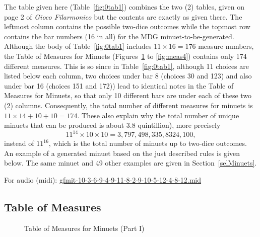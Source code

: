 \documentclass[a4paper,x11names,svgnames,10pt]{article}
\begin{document}
{The table given here (Table~\ref{fig:0tab1}) combines the two (2) tables, given on page 2 of {\it Gioco Filarmonico} but the contents are exactly as given there.  The leftmost column contains the possible two-dice outcomes while the topmost row contains the bar numbers (16 in all) for the MDG minuet-to-be-generated. \\

Although the body of Table~\ref{fig:0tab1} includes $11\times 16 = 176$ measure numbers, the Table of Measures for Minuets (Figures~\ref{fig:meas1} to \ref{fig:meas4}) contains only 174 different measures.  This is so since in Table~\ref{fig:0tab1}, although 11 choices are listed below each column, two choices under bar 8 (choices 30 and 123) and also under bar 16 (choices 151 and 172)) lead to identical notes in the Table of Measures for Minuets, so that only 10 different bars are under each of these two (2) columns. Consequently, the total number of different measures for minuets is $11\times 14 + 10 + 10 = 174$. These also explain why the total number of unique minuets that can be produced is about 3.8 quintillion), more precisely $$11^{14} \times 10 \times 10 = 3,797,498,335,8324,100,$$
instead of $11^{16}$, which is the total number of minuets up to two-dice outcomes. \\

An example of a generated minuet based on the just described rules is given below.  The same minuet and 49 other examples are given in Section~\ref{selMinuets}.

\begin{figure}[H]
	\centering
	\def\svgwidth{\columnwidth}
	
\end{figure}
\nopagebreak[4]
\vspace{-0.15in}
{\scriptsize For audio (midi): \hyperref{./gfmit-10-3-6-9-4-9-11-8-2-9-10-5-12-4-8-12.mid}{}{}{gfmit-10-3-6-9-4-9-11-8-2-9-10-5-12-4-8-12.mid}}


\nopagebreak[4]
\subsection{Table of Measures}\label{tableMeas}

\begin{figure}[H]
	\centering
	\def\svgwidth{0.975\columnwidth}
	
	\caption{Table of Measures for Minuets (Part I)}
	\label{fig:meas1}
\end{figure}

}
\end{document}
